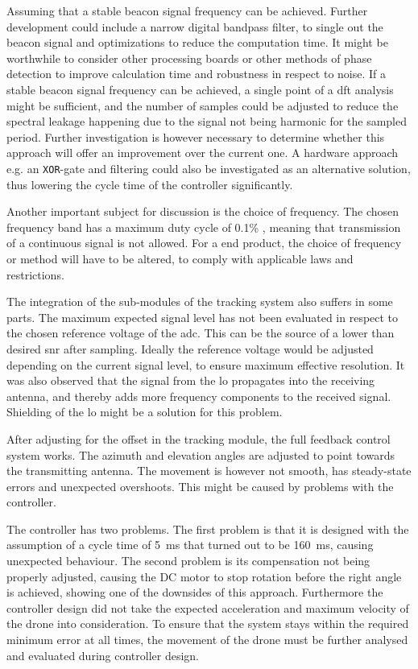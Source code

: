 Assuming that a stable beacon signal frequency can be achieved. Further development could include a narrow digital bandpass filter, to single out the beacon signal and optimizations to reduce the computation time. It might be worthwhile to consider other processing boards or other methods of phase detection to improve calculation time and robustness in respect to noise. If a stable beacon signal frequency can be achieved, a single point of a \gls{dft} analysis might be sufficient, and the number of samples could be adjusted to reduce the spectral leakage happening due to the signal not being harmonic for the sampled period. Further investigation is however necessary to determine whether this approach will offer an improvement over the current one. A hardware approach e.g. an \texttt{XOR}-gate and filtering could also be investigated as an alternative solution, thus lowering the cycle time of the controller significantly.

Another important subject for discussion is the choice of frequency. The chosen frequency band has a maximum duty cycle of 0.1\% \citep{web:RegulationFreq869}, meaning that transmission of a continuous signal is not allowed. For a end product, the choice of frequency or method will have to be altered, to comply with applicable laws and restrictions.

The integration of the sub-modules of the tracking system also suffers in some parts. The maximum expected signal level has not been evaluated in respect to the chosen reference voltage of the \gls{adc}. This can be the source of a lower than desired \gls{snr} after sampling. Ideally the reference voltage would be adjusted depending on the current signal level, to ensure maximum effective resolution. It was also observed that the signal from the \gls{lo} propagates into the receiving antenna, and thereby adds more frequency components to the received signal. Shielding of the \gls{lo} might be a solution for this problem.

After adjusting for the offset in the tracking module, the full feedback control system works. The azimuth and elevation angles are adjusted to point towards the transmitting antenna. The movement is however not smooth, has steady-state errors and unexpected overshoots. This might be caused by problems with the controller. 

The controller has two problems. The first problem is that it is designed with the assumption of a cycle time of \SI{5}{\milli\second} that turned out to be \SI{160}{\milli\second}, causing unexpected behaviour. The second problem is its compensation not being properly adjusted, causing the DC motor to stop rotation before the right angle is achieved, showing one of the downsides of this approach. Furthermore the controller design did not take the expected acceleration and maximum velocity of the drone into consideration. To ensure that the system stays within the required minimum error at all times, the movement of the drone must be further analysed and evaluated during controller design. 

